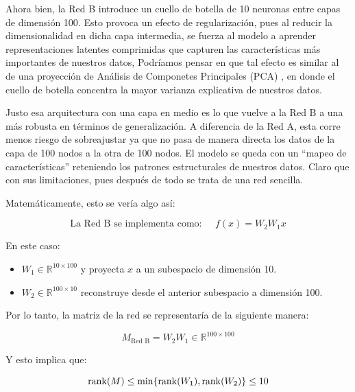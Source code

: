 
Ahora bien, la Red B introduce un cuello de botella de 10 neuronas entre capas de dimensión 100. Esto provoca
un efecto de regularización, pues al reducir la dimensionalidad en dicha capa intermedia, se fuerza al modelo
a aprender representaciones latentes comprimidas que capturen las características más importantes de nuestros
datos, Podríamos pensar en que tal efecto es similar al de una proyección de Análisis de Componetes Principales (PCA)
, en donde el cuello de botella concentra la mayor varianza explicativa de nuestros datos. 

Justo esa arquitectura con una capa en medio es lo que vuelve a la Red B a una más robusta en términos de
generalización. A diferencia de la Red A, esta corre menos riesgo de sobreajustar ya que no pasa de manera
directa los datos de la capa de 100 nodos a la otra de 100 nodos. El modelo se queda con un ``mapeo de características''
reteniendo los patrones estructurales de nuestros datos. Claro que con sus limitaciones, pues después de todo 
se trata de una red sencilla. 

Matemáticamente, esto se vería algo así:

\[
    \text{La Red B se implementa como:} \;\;\;\;\; f(x) = W_2 W_1 x
\]

En este caso:

\begin{itemize}
    \item $W_1 \in \mathbb{R}^{10 \times 100}$ y proyecta $x$ a un subespacio de dimensión 10.
    \item $W_2 \in \mathbb{R}^{100 \times 10}$ reconstruye desde el anterior subespacio a dimensión 100. 
\end{itemize}

Por lo tanto, la matriz de la red se representaría de la siguiente manera:

\[
    M_{\text{Red B}} = W_2 W_1 \in \mathbb{R}^{100 \times 100} 
\]

Y esto implica que: 

\[
    \rank(M) \leq \min\{\rank(W_1), \rank(W_2)\} \leq 10
\]


